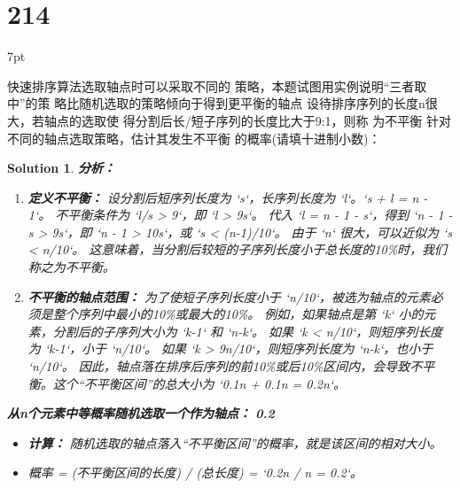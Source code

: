 \documentclass[UTF8]{report}
\newtheorem{solution}{Solution}
\theoremstyle{MyLineTheoremStyle} %
\theoremstyle{MyBlockTheoremStyle} %
\theoremstyle{MySubsubsectionStyle} %
\newenvironment{graybox}{%
        \def\FrameCommand{%
        \hspace{1pt}%
        {\color{gray}\small \vrule width 2pt}%
        {\color{graybox_color}\vrule width 4pt}%
        \colorbox{graybox_color}%
        }%
        \MakeFramed{\advance\hsize-\width\FrameRestore}%
        \noindent\hspace{-4.55pt}%
        \begin{adjustwidth}{}{7pt}%
        \vspace{2pt}\vspace{2pt}%
        }
        {%
        \vspace{2pt}\end{adjustwidth}\endMakeFramed%
        }
\begin{document}
\section*{214}
\begin{graybox}
快速排序算法选取轴点时可以采取不同的
策略，本题试图用实例说明“三者取中”的策
略比随机选取的策略倾向于得到更平衡的轴点
设待排序序列的长度n很大，若轴点的选取使
得分割后长/短子序列的长度比大于9:1，则称
为不平衡
针对不同的轴点选取策略，估计其发生不平衡
的概率(请填十进制小数)：
\end{graybox}

\begin{solution}
\textbf{分析：}
\begin{enumerate}
    \item \textbf{定义不平衡：}
    设分割后短序列长度为 `s`，长序列长度为 `l`。`s + l = n - 1`。
    不平衡条件为 `l/s > 9`，即 `l > 9s`。
    代入 `l = n - 1 - s`，得到 `n - 1 - s > 9s`，即 `n - 1 > 10s`，或 `s < (n-1)/10`。
    由于 `n` 很大，可以近似为 `s < n/10`。
    这意味着，当分割后较短的子序列长度小于总长度的10\%时，我们称之为不平衡。

    \item \textbf{不平衡的轴点范围：}
    为了使短子序列长度小于 `n/10`，被选为轴点的元素必须是整个序列中最小的10\%或最大的10\%。
    例如，如果轴点是第 `k` 小的元素，分割后的子序列大小为 `k-1` 和 `n-k`。
    如果 `k < n/10`，则短序列长度为 `k-1`，小于 `n/10`。
    如果 `k > 9n/10`，则短序列长度为 `n-k`，也小于 `n/10`。
    因此，轴点落在排序后序列的前10\%或后10\%区间内，会导致不平衡。这个“不平衡区间”的总大小为 `0.1n + 0.1n = 0.2n`。
\end{enumerate}

\textbf{从n个元素中等概率随机选取一个作为轴点：} \textbf{0.2}
\begin{itemize}
    \item \textbf{计算：} 随机选取的轴点落入“不平衡区间”的概率，就是该区间的相对大小。
    \item 概率 = (不平衡区间的长度) / (总长度) = `0.2n / n = 0.2`。
\end{itemize}


\end{solution}
\end{document}
